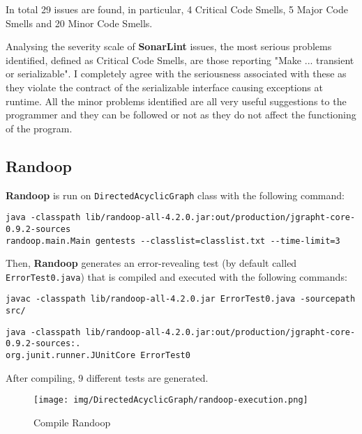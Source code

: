 \documentclass[a4paper,12pt]{article} %
\begin{document}
	In total 29 issues are found, in particular, 4 Critical Code Smells, 5 Major Code Smells and 20 Minor Code Smells.
	
	Analysing  the severity scale of \textbf{SonarLint} issues, the most serious problems identified, defined as Critical Code Smells, are those reporting "Make ... transient or serializable". I completely agree with the seriousness associated with these as they violate the contract of the serializable interface causing exceptions at runtime.
	All the minor problems identified are all very useful suggestions to the programmer and they can be followed or not as they do not affect the functioning of the program.
		
	\subsection*{Randoop}
	
	\textbf{Randoop} is run on \texttt{DirectedAcyclicGraph} class with the following command:
	
	\begin{lstlisting}[style=DOS,caption={Randoop Execution}, captionpos=b]
java -classpath lib/randoop-all-4.2.0.jar:out/production/jgrapht-core-0.9.2-sources 
randoop.main.Main gentests --classlist=classlist.txt --time-limit=3
	\end{lstlisting}
	
	Then, \textbf{Randoop} generates an error-revealing test (by default called \\ \texttt{ErrorTest0.java}) that is compiled and executed with the following commands:
	\begin{lstlisting}[style=DOS,caption={Compile Error Revealing Test}, captionpos=b]
javac -classpath lib/randoop-all-4.2.0.jar ErrorTest0.java -sourcepath src/
	\end{lstlisting}
	
	\begin{lstlisting}[style=DOS,caption={Execute Error Revealing Test}, captionpos=b]
java -classpath lib/randoop-all-4.2.0.jar:out/production/jgrapht-core-0.9.2-sources:. 
org.junit.runner.JUnitCore ErrorTest0
	\end{lstlisting}	
	
	After compiling, 9 different tests are generated.
	\begin{figure}[H]
		\centering
		\texttt{[image: img/DirectedAcyclicGraph/randoop-execution.png]}
		\caption{Compile {Randoop}}
		\label{fig:randexe-graph}
	\end{figure}
\end{document}
